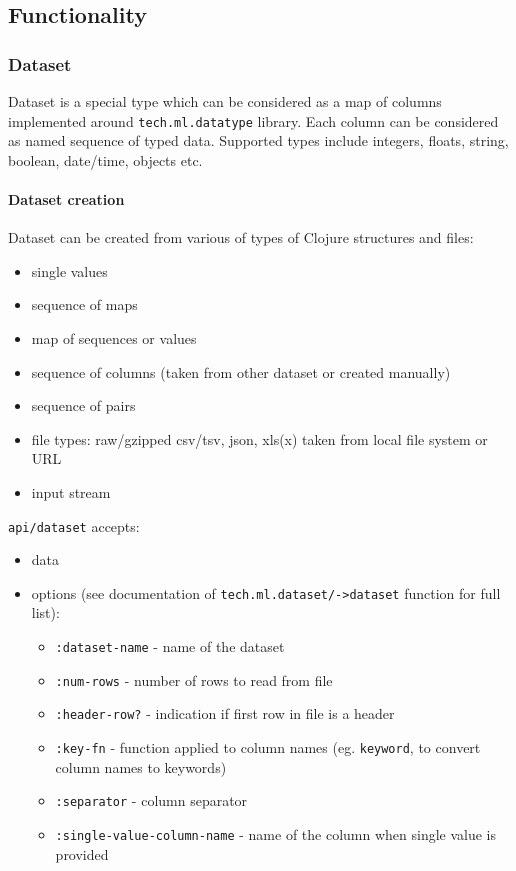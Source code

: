 \documentclass[]{article}
\providecommand{\tightlist}{%
  \setlength{\itemsep}{0pt}\setlength{\parskip}{0pt}}
\let\oldparagraph\paragraph
\renewcommand{\paragraph}[1]{\oldparagraph{#1}\mbox{}}
\begin{document}
\subsection{Functionality}\label{functionality}

\subsubsection{Dataset}\label{dataset}

Dataset is a special type which can be considered as a map of columns
implemented around \texttt{tech.ml.datatype} library. Each column can be
considered as named sequence of typed data. Supported types include
integers, floats, string, boolean, date/time, objects etc.

\paragraph{Dataset creation}\label{dataset-creation}

Dataset can be created from various of types of Clojure structures and
files:

\begin{itemize}
\tightlist
\item
  single values
\item
  sequence of maps
\item
  map of sequences or values
\item
  sequence of columns (taken from other dataset or created manually)
\item
  sequence of pairs
\item
  file types: raw/gzipped csv/tsv, json, xls(x) taken from local file
  system or URL
\item
  input stream
\end{itemize}

\texttt{api/dataset} accepts:

\begin{itemize}
\tightlist
\item
  data
\item
  options (see documentation of
  \texttt{tech.ml.dataset/-\textgreater{}dataset} function for full
  list):

  \begin{itemize}
  \tightlist
  \item
    \texttt{:dataset-name} - name of the dataset
  \item
    \texttt{:num-rows} - number of rows to read from file
  \item
    \texttt{:header-row?} - indication if first row in file is a header
  \item
    \texttt{:key-fn} - function applied to column names (eg.
    \texttt{keyword}, to convert column names to keywords)
  \item
    \texttt{:separator} - column separator
  \item
    \texttt{:single-value-column-name} - name of the column when single
    value is provided
  \end{itemize}
\end{itemize}
\end{document}
